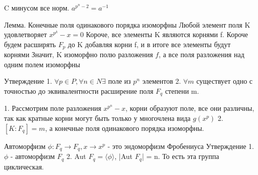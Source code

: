 \documentclass{article}
\begin{document}
C минусом все норм.
$a^{p^n - 2} = a^{-1}$

Лемма. Конечные поля одинакового порядка изоморфны
Любой элемент поля K удовлетворяет $x^{p^k} - x = 0$
Короче, все элементы K являются корнями f. Короче будем расширять $F_p$ до K добавляя корни f, и в итоге все элементы будут корнями
Значит, K изоморфно полю разложения $f$, а все поля разложения над одним полем изоморфны

Утверждение
1. $\forall p \in P, \forall n \in N \exists$ поле из $p^n$ элементов
2. $\forall m$ существует одно с точностью до эквивалентности расширение поля $F_q$ степени m.

1. Рассмотрим поле разложения $x^{p^n} - x$, корни образуют поле, все они различны, так как кратные корни могут быть только у многочлена вида $g(x^p)$
2. $[K : F_q] = m$, а конечные поля одинакового порядка изоморфны.

Автоморфизм $\phi : F_q \rightarrow F_q, x \rightarrow x^p$ - это эндоморфизм Фробениуса
Утверждение
1. $\phi$ - автоморфизм $F_q$
2. Aut $F_q = \langle \phi \rangle$, |Aut $F_q$| = n.
То есть эта группа циклическая.
\end{document}
